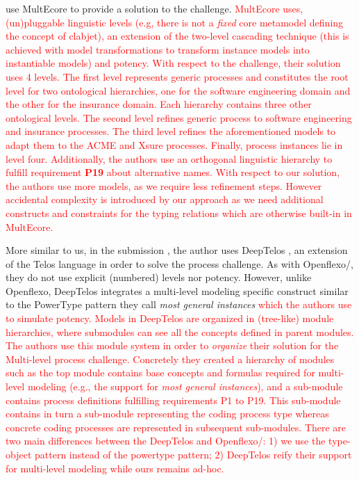 \cite{multiecore2019} use MultEcore \citep{multecore2016} to provide a solution to the challenge. \textcolor{red}{MultEcore uses, (un)pluggable linguistic levels (e.g, there is not a \emph{fixed} core metamodel defining the concept of clabjet), an extension of the two-level cascading technique \citep{atkinson2005concepts} (this is achieved with model transformations to transform instance models into instantiable models) and potency. With respect to the challenge, their solution uses 4 levels. The first level represents generic processes and constitutes the root level for two ontological hierarchies, one for the software engineering domain and the other for the insurance domain. Each hierarchy contains three other ontological levels. The second level refines generic process to software engineering and insurance processes. The third level refines the aforementioned models to adapt them to the ACME and Xsure processes. Finally, process instances lie in level four. Additionally, the authors use an orthogonal linguistic hierarchy to fulfill requirement \textbf{P19} about alternative names. With respect to our solution, the authors use more models, as we require less refinement steps. However accidental complexity is introduced by our approach as we need additional constructs and constraints for the typing relations which are otherwise built-in in MultEcore.} 


More similar to us, in the submission \parencite{deeptelos2019}, the author uses DeepTelos \parencite{deeptelos2016}, an extension of the Telos language \parencite{telos1990} in order to solve the process challenge. As with Openflexo/\FML, they do not use explicit (numbered) levels nor potency. However, unlike Openflexo, DeepTelos integrates a multi-level modeling specific construct similar to the PowerType \parencite{atkinson2001essence} pattern they call \emph{most general instances} \textcolor{red}{which the authors use to simulate potency. Models in DeepTelos are organized in (tree-like) module hierarchies, where submodules can see all the concepts defined in parent modules. The authors use this module system in order to \emph{organize} their solution for the Multi-level process challenge. Concretely they created a hierarchy of modules such as the top module contains base concepts and formulas required for multi-level modeling (e.g., the support for \emph{most general instances}), and a sub-module contains process definitions fulfilling requirements P1 to P19. This sub-module contains in turn a sub-module representing the coding process type whereas concrete coding processes are represented in subsequent sub-modules. There are two main differences between the DeepTelos and Openflexo/\FML: 1) we use the type-object pattern instead of the powertype pattern; 2) DeepTelos reify their support for multi-level modeling while ours remains ad-hoc.}


